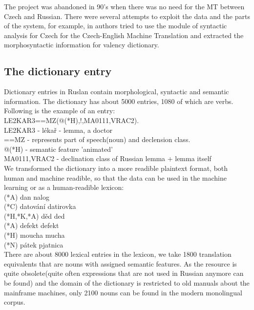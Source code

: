 \documentclass[letterpaper]{article}
\begin{document}
\begin{itemize}
 The project was abandoned in 90's when
there was no need for the MT between Czech and Russian. There were
several attempts to exploit the data and the parts of the system, for
example, in \cite{mt-recycled} authors tried to use the module
of syntactic analysis for Czech for the Czech-English Machine Translation
and \cite{pisa2012} extracted the morphosyntactic information for
valency dictionary.
\subsection{The dictionary entry}
Dictionary entries in Ruslan contain morphological,
syntactic and semantic information.
The dictionary has about 5000 entries, 1080 of which are verbs.
Following is the example of an entry:\\
LE2KAR3==MZ(@(*H),!,MA0111,VRAC2).\\
LE2KAR3 - lékař - lemma, a doctor\\
==MZ - represents part of speech(noun) and declension class.\\
@(*H) - semantic feature 'animated'\\
MA0111,VRAC2 - declination class of Russian lemma + lemma itself\\
We transformed the dictionary into a more readible plaintext format,
both human and machine readible, so that the data can be used in
the machine learning or as a human-readible lexicon:\\
(*A) dan nalog\\
(*C) datování datirovka\\
(*H,*K,*A) děd ded\\
(*A) defekt defekt\\
(*H) moucha mucha\\
(*N) pátek pjatnica\\
There are about 8000 lexical entries in the lexicon, we take 1800
translation equivalents that are nouns with assigned semantic features.
As the resource is quite obsolete(quite often expressions that are not used in Russian
anymore can be found) and the domain of the dictionary is restricted to old manuals
about the mainframe machines, only 2100 nouns
can be found in the modern monolingual corpus.

\end{itemize}
\end{document}
